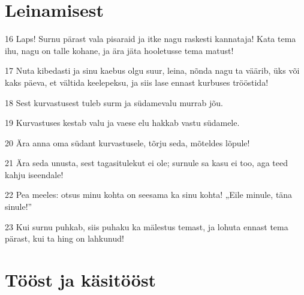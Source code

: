 \section*{Leinamisest}

\par 16 Laps! Surnu pärast vala pisaraid ja itke nagu raskesti kannataja! Kata tema ihu, nagu on talle kohane, ja ära jäta hooletusse tema matust!
\par 17 Nuta kibedasti ja sinu kaebus olgu suur, leina, nõnda nagu ta väärib, üks või kaks päeva, et vältida keelepeksu, ja siis lase ennast kurbuses trööstida!
\par 18 Sest kurvastusest tuleb surm ja südamevalu murrab jõu.
\par 19 Kurvastuses kestab valu ja vaese elu hakkab vastu südamele.
\par 20 Ära anna oma südant kurvastusele, tõrju seda, mõteldes lõpule!
\par 21 Ära seda unusta, sest tagasitulekut ei ole; surnule sa kasu ei too, aga teed kahju iseendale!
\par 22 Pea meeles: otsus minu kohta on seesama ka sinu kohta! „Eile minule, täna sinule!”
\par 23 Kui surnu puhkab, siis puhaku ka mälestus temast, ja lohuta ennast tema pärast, kui ta hing on lahkunud!

\section*{Tööst ja käsitööst}

